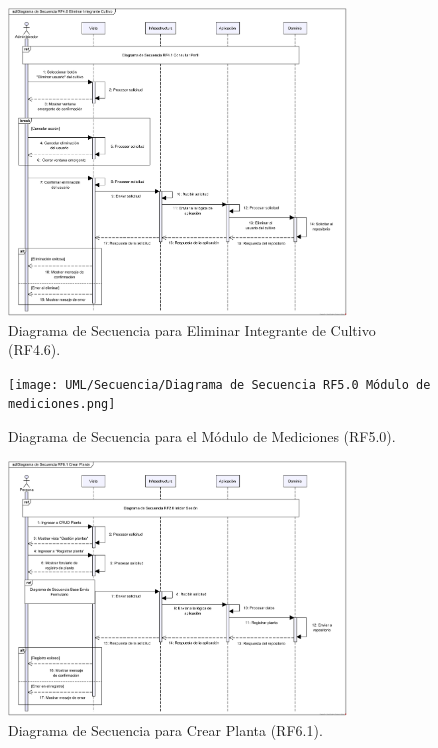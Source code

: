 \begin{figure}[H]
	\centering
	\caption{Diagrama de Secuencia para Eliminar Integrante de Cultivo (RF4.6).}
 \includegraphics[width=0.8\textwidth]{UML/Secuencia/Diagrama de Secuencia RF4.6 Eliminar Integrante Cultivo.png}
\end{figure}


\begin{figure}[H]
	\centering
		\caption{Diagrama de Secuencia para el Módulo de Mediciones (RF5.0).}
	\texttt{[image: UML/Secuencia/Diagrama de Secuencia RF5.0 Módulo de mediciones.png]}
\end{figure}


\begin{figure}[H]
	\centering
	\caption{Diagrama de Secuencia para Crear Planta (RF6.1).}
 \includegraphics[width=0.8\textwidth]{UML/Secuencia/Diagrama de Secuencia RF6.1 Crear Planta.png}
\end{figure}


